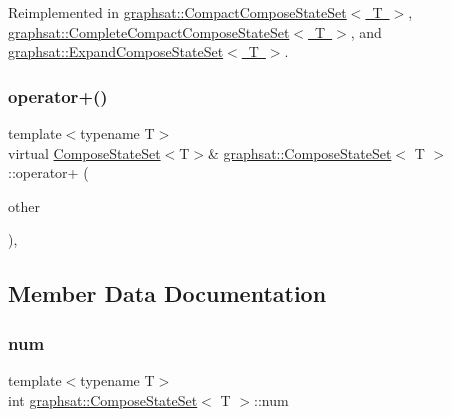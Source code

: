 Reimplemented in \mbox{\hyperlink{classgraphsat_1_1_compact_compose_state_set_a0a42f9a9d01b52368209db0e1c5e67b7}{graphsat\+::\+Compact\+Compose\+State\+Set$<$ T $>$}}, \mbox{\hyperlink{classgraphsat_1_1_complete_compact_compose_state_set_a2ba10c7aa62262e0c7cc009573cd7a01}{graphsat\+::\+Complete\+Compact\+Compose\+State\+Set$<$ T $>$}}, and \mbox{\hyperlink{classgraphsat_1_1_expand_compose_state_set_a4c014106669978321e07e0c9b7783479}{graphsat\+::\+Expand\+Compose\+State\+Set$<$ T $>$}}.

\mbox{\label{classgraphsat_1_1_compose_state_set_a615b1e99b8dd086e1112bf424e29bd16}} 
\subsubsection{\texorpdfstring{operator+()}{operator+()}}
{\footnotesize\ttfamily template$<$typename T$>$ \\
virtual \mbox{\hyperlink{classgraphsat_1_1_compose_state_set}{Compose\+State\+Set}}$<$T$>$\& \mbox{\hyperlink{classgraphsat_1_1_compose_state_set}{graphsat\+::\+Compose\+State\+Set}}$<$ T $>$\+::operator+ (\begin{DoxyParamCaption}\item[{const \mbox{\hyperlink{classgraphsat_1_1_compose_state_set}{Compose\+State\+Set}}$<$ T $>$ \&}]{other }\end{DoxyParamCaption})\hspace{0.3cm}{\ttfamily [inline]}, {\ttfamily [virtual]}}



\subsection{Member Data Documentation}
\mbox{\label{classgraphsat_1_1_compose_state_set_a26fd1ff0f5da83459419e542597dbf2d}} 
\subsubsection{\texorpdfstring{num}{num}}
{\footnotesize\ttfamily template$<$typename T$>$ \\
int \mbox{\hyperlink{classgraphsat_1_1_compose_state_set}{graphsat\+::\+Compose\+State\+Set}}$<$ T $>$\+::num\hspace{0.3cm}{\ttfamily [protected]}}

